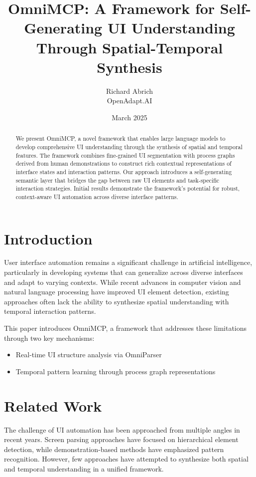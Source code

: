 \documentclass{article}
\title{OmniMCP: A Framework for Self-Generating UI Understanding Through Spatial-Temporal Synthesis}
\author{Richard Abrich \\ OpenAdapt.AI}
\date{March 2025}
\begin{document}
\maketitle

\begin{abstract}
We present OmniMCP, a novel framework that enables large language models to develop comprehensive UI understanding through the synthesis of spatial and temporal features. The framework combines fine-grained UI segmentation with process graphs derived from human demonstrations to construct rich contextual representations of interface states and interaction patterns. Our approach introduces a self-generating semantic layer that bridges the gap between raw UI elements and task-specific interaction strategies. Initial results demonstrate the framework's potential for robust, context-aware UI automation across diverse interface patterns.
\end{abstract}

\section{Introduction}
User interface automation remains a significant challenge in artificial intelligence, particularly in developing systems that can generalize across diverse interfaces and adapt to varying contexts. While recent advances in computer vision and natural language processing have improved UI element detection, existing approaches often lack the ability to synthesize spatial understanding with temporal interaction patterns.

This paper introduces OmniMCP, a framework that addresses these limitations through two key mechanisms:
\begin{itemize}
    \item Real-time UI structure analysis via OmniParser
    \item Temporal pattern learning through process graph representations
\end{itemize}

\section{Related Work}
The challenge of UI automation has been approached from multiple angles in recent years. Screen parsing approaches have focused on hierarchical element detection, while demonstration-based methods have emphasized pattern recognition. However, few approaches have attempted to synthesize both spatial and temporal understanding in a unified framework.
\end{document}
